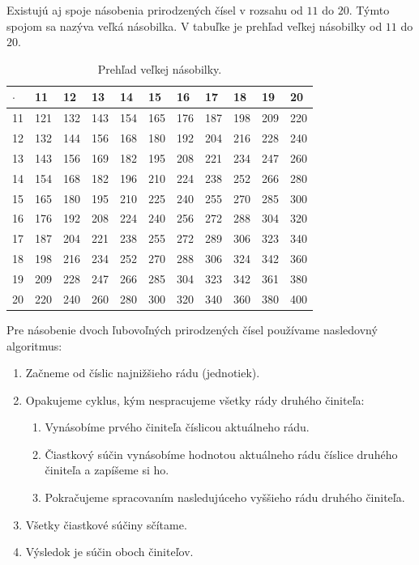 \documentclass{article}
\begin{document}
Existujú aj spoje násobenia prirodzených čísel v rozsahu od \(11\) do \(20\). Týmto spojom sa nazýva veľká násobilka. V tabuľke je prehľad veľkej násobilky od \(11\) do \(20\).
\begin{table}[H]
  \centering
  \renewcommand{\arraystretch}{1.3}
  \begin{tabular}{C|CCCCCCCCCC}
    \(\cdot\) & 11 & 12 & 13 & 14 & 15 & 16 & 17 & 18 & 19 & 20 \\
     & 121 & 132 & 143 & 154 & 165 & 176 & 187 & 198 & 209 & 220 \\
    12 & 132 & 144 & 156 & 168 & 180 & 192 & 204 & 216 & 228 & 240 \\
    13 & 143 & 156 & 169 & 182 & 195 & 208 & 221 & 234 & 247 & 260 \\
    14 & 154 & 168 & 182 & 196 & 210 & 224 & 238 & 252 & 266 & 280 \\
    15 & 165 & 180 & 195 & 210 & 225 & 240 & 255 & 270 & 285 & 300 \\
    16 & 176 & 192 & 208 & 224 & 240 & 256 & 272 & 288 & 304 & 320 \\
    17 & 187 & 204 & 221 & 238 & 255 & 272 & 289 & 306 & 323 & 340 \\
    18 & 198 & 216 & 234 & 252 & 270 & 288 & 306 & 324 & 342 & 360 \\
    19 & 209 & 228 & 247 & 266 & 285 & 304 & 323 & 342 & 361 & 380 \\
    20 & 220 & 240 & 260 & 280 & 300 & 320 & 340 & 360 & 380 & 400 \\
  \end{tabular}
  \caption{Prehľad veľkej násobilky.}
\end{table}

Pre násobenie dvoch ľubovoľných prirodzených čísel používame nasledovný algoritmus:
\begin{enumerate}[label=\arabic*)]
  \item Začneme od číslic najnižšieho rádu (jednotiek).
  \item Opakujeme cyklus, kým nespracujeme všetky rády druhého činiteľa:
  \begin{enumerate}
    \item Vynásobíme prvého činiteľa číslicou aktuálneho rádu.
    \item Čiastkový súčin vynásobíme hodnotou aktuálneho rádu číslice druhého činiteľa a zapíšeme si ho.
    \item Pokračujeme spracovaním nasledujúceho vyššieho rádu druhého činiteľa.
  \end{enumerate}
  \item Všetky čiastkové súčiny sčítame.
  \item Výsledok je súčin oboch činiteľov.
\end{enumerate}
\end{document}
